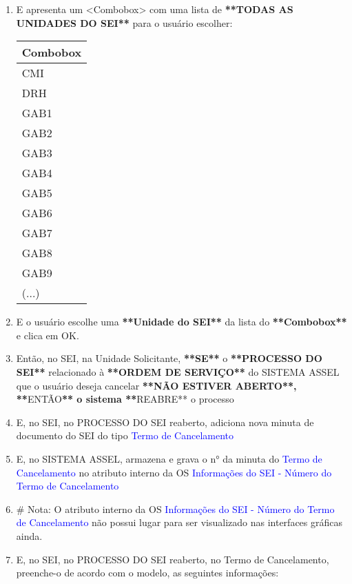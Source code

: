 \begin{enumerate}
	\item E apresenta um <Combobox> com uma lista de \textbf{**TODAS AS UNIDADES DO SEI**} para o usuário escolher:
	
	\begin{tabular}{|l|}
		\hline
		\rowcolor{blue!40} Combobox \\ \hline
		\rowcolor{blue!10} CMI \\ \hline
		\rowcolor{blue!20} DRH \\ \hline
		\rowcolor{blue!10} GAB1 \\ \hline
		\rowcolor{blue!20} GAB2 \\ \hline
		\rowcolor{blue!10} GAB3 \\ \hline
		\rowcolor{blue!20} GAB4 \\ \hline
		\rowcolor{blue!10} GAB5 \\ \hline
		\rowcolor{blue!20} GAB6 \\ \hline
		\rowcolor{blue!10} GAB7 \\ \hline
		\rowcolor{blue!20} GAB8 \\ \hline
		\rowcolor{blue!10} GAB9 \\ \hline
		\rowcolor{blue!20} (...) \\ \hline
	\end{tabular}
	
	\item E o usuário escolhe uma \textbf{**Unidade do SEI**} da lista do \textbf{**Combobox**} e clica em OK.
	\item Então, no SEI, na Unidade Solicitante, \textbf{**SE**} o \textbf{**PROCESSO DO SEI**} relacionado à \textbf{**ORDEM DE SERVIÇO**} do SISTEMA ASSEL que o usuário deseja cancelar \textbf{**NÃO ESTIVER ABERTO**, **}ENTÃO\textbf{** o sistema **}REABRE** o processo
	\item E, no SEI, no PROCESSO DO SEI reaberto, adiciona nova minuta de documento do SEI do tipo \textcolor{blue}{Termo de Cancelamento}
	\item E, no SISTEMA ASSEL, armazena e grava o n° da minuta do \textcolor{blue}{Termo de Cancelamento} no atributo interno da OS \textcolor{blue}{Informações do SEI - Número do Termo de Cancelamento}
	\item \# Nota: O atributo interno da OS \textcolor{blue}{Informações do SEI - Número do Termo de Cancelamento} não possui lugar para ser visualizado nas interfaces gráficas ainda.
	\item E, no SEI, no PROCESSO DO SEI reaberto, no Termo de Cancelamento, preenche-o de acordo com o modelo, as seguintes informações:
	

\end{enumerate}
